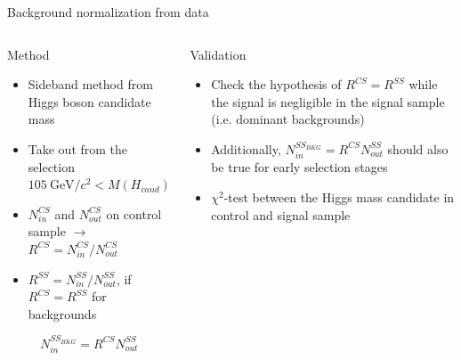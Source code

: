 \begin{frame}{Background normalization from data}
\vspace{-.2cm}

\begin{columns}
\begin{column}{.50\textwidth}
   \begin{block}{\tiny{Method}}\tiny
     \begin{itemize}
     \item Sideband method from Higgs boson candidate mass
     \item Take out from the selection $105~\text{GeV}/c^{2} <M(H_{cand})<145~\text{GeV}/c^{2}$
     \item $N^{CS}_{in}$ and $N^{CS}_{out}$ on control sample $\to$ $R^{CS}=N^{CS}_{in}/N^{CS}_{out}$
     \item $R^{SS}=N^{SS}_{in}/N^{SS}_{out}$, if $R^{CS} = R^{SS}$ for backgrounds
     \end{itemize}
     \begin{equation*} 
       N^{SS_{BKG}}_{in}=R^{CS}N^{SS}_{out}
     \end{equation*}
    \end{block}
\end{column}

\begin{column}{.50\textwidth}
\begin{block}{\tiny{Validation}}\tiny
\begin{itemize}
\item Check the hypothesis of $R^{CS} = R^{SS}$ while the signal is negligible in the signal sample (i.e. dominant backgrounds)
\item Additionally, $N^{SS_{BKG}}_{in}=R^{CS}N^{SS}_{out}$ should also be true for early selection stages
\item $\chi^{2}$-test between the Higgs mass candidate in control and signal sample
\end{itemize}
\end{block}
\end{column}

\end{columns}


\end{frame}
